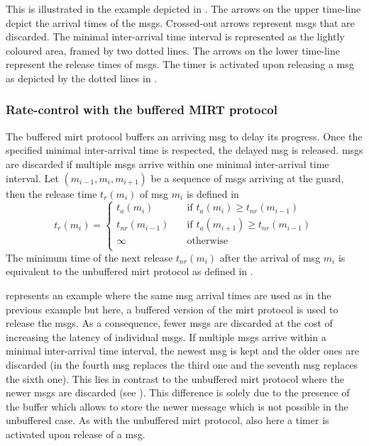 This is illustrated in the example depicted in \Fig{\ref{fig_rate_ctl_mirt}}.
The arrows on the upper time-line depict the arrival times of the \glspl*{msg}.
Crossed-out arrows represent \glspl*{msg} that are discarded.
The minimal inter-arrival time interval is represented as the lightly coloured area, framed by two dotted lines.
The arrows on the lower time-line represent the release times of \glspl*{msg}.
The timer is activated upon releasing a \gls*{msg} as depicted by the dotted lines in \Fig{\ref{fig_rate_ctl_mirt}}.

\subsubsection{Rate-control with the buffered MIRT protocol}
The buffered \gls{mirt} protocol buffers an arriving \gls*{msg} to delay its progress.
Once the specified minimal inter-arrival time is respected, the delayed \gls*{msg} is released.
\Glspl*{msg} are discarded if multiple \glspl*{msg} arrive within one minimal inter-arrival time interval.
Let $( m_{i-1}, m_i, m_{i+1} )$ be a sequence of \glspl*{msg} arriving at the guard, then the release time $t_r(m_i)$ of \gls*{msg} $m_i$ is defined in \Equ{\ref{eq_bmirt_release}}
\begin{equation}
    t_r(m_i) =
        \begin{cases}
            t_a(m_i)        & \quad \text{if } t_a(m_i) \geq t_{nr}(m_{i-1})\\
            t_{nr}(m_{i-1}) & \quad \text{if } t_a(m_{i+1}) \geq t_{nr}(m_{i-1})\\
            \infty          & \quad \text{otherwise }\\
        \end{cases}
    \label{eq_bmirt_release}
\end{equation}
The minimum time of the next release $t_{nr}(m_i)$ after the arrival of \gls*{msg} $m_i$ is equivalent to the unbuffered \gls{mirt} protocol as defined in \Equ{\ref{eq_mirt_next_release}}.

\Fig{\ref{fig_rate_ctl_bmirt}} represents an example where the same \gls*{msg} arrival times are used as in the previous example but here, a buffered version of the \gls{mirt} protocol is used to release the \glspl*{msg}.
As a consequence, fewer \glspl*{msg} are discarded at the cost of increasing the latency of individual \glspl*{msg}.
If multiple \glspl*{msg} arrive within a minimal inter-arrival time interval, the newest \gls*{msg} is kept and the older ones are discarded (\eg in \Fig{\ref{fig_rate_ctl_bmirt}} the fourth \gls*{msg} replaces the third one and the seventh \gls*{msg} replaces the sixth one).
This lies in contrast to the unbuffered \gls{mirt} protocol where the newer \glspl*{msg} are discarded (see \Fig{\ref{fig_rate_ctl_mirt}}).
This difference is solely due to the presence of the buffer which allows to store the newer message which is not possible in the unbuffered case.
As with the unbuffered \gls{mirt} protocol, also here a timer is activated upon release of a \gls*{msg}.

